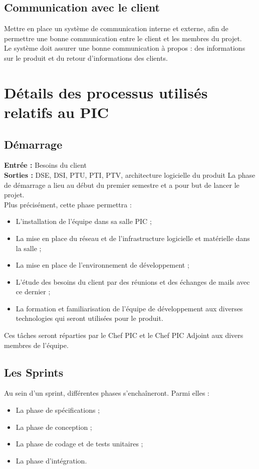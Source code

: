 \subsection{Communication avec le client}

Mettre en place un système de communication interne et externe, afin de permettre une bonne communication entre le client et les membres du projet.\\
 Le système doit assurer une bonne communication à propos : des informations sur le produit et du retour d’informations des clients.

\section{Détails des processus utilisés relatifs au PIC}

\subsection{Démarrage}

\textbf{Entrée :} Besoins du client \\
\textbf{Sorties :} DSE, DSI, PTU, PTI, PTV, architecture logicielle du produit
La phase de démarrage a lieu au début du premier semestre et a pour but de lancer le projet. \\
Plus précisément, cette phase permettra :
\begin{itemize}


\item L’installation de l’équipe dans sa salle PIC ;
\item  La mise en place du réseau et de l’infrastructure logicielle et matérielle dans la salle ;
\item La mise en place de l’environnement de développement ;
\item  L’étude des besoins du client par des réunions et des échanges de mails avec ce dernier ;
\item La formation et familiarisation de l’équipe de développement aux diverses technologies qui seront utilisées pour le produit.
\end{itemize}
Ces tâches seront réparties par le Chef PIC et le Chef PIC Adjoint aux divers membres de l’équipe.

\subsection{Les Sprints}
Au sein d’un sprint, différentes phases s’enchaîneront. Parmi elles :
\begin{itemize}
\item La phase de spécifications ;
\item La phase de conception ;
\item La phase de codage et de tests unitaires ;
\item La phase d’intégration.
\end{itemize}

